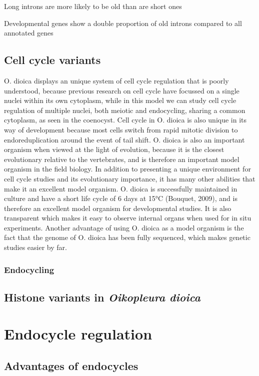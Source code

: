 \documentclass[11pt,twoside,a4paper]{report}
\begin{document}
Long introns are more likely to be old than are short ones

Developmental genes show a double proportion of old introns compared to all annotated genes
		

		\subsection{Cell cycle variants}
		\label{subsection:CellCycleVariants}
		O. dioica displays an unique system of cell cycle regulation that is poorly understood, because previous research on cell cycle have focussed on a single nuclei within its own cytoplasm, while in this model we can study cell cycle regulation of multiple nuclei, both meiotic and endocycling, sharing a common cytoplasm, as seen in the coenocyst. Cell cycle in O. dioica is also unique in its way of development because most cells switch from rapid mitotic division to endoreduplication around the event of tail shift. O. dioica is also an important organism when viewed at the light of evolution, because it is the closest evolutionary relative to the vertebrates, and is therefore an important model organism in the field biology. In addition to presenting a unique environment for cell cycle studies and its evolutionary importance, it has many other abilities that make it an excellent model organism. O. dioica is successfully maintained in culture and have a short life cycle of 6 days at 15°C (Bouquet, 2009), and is therefore an excellent model organism for developmental studies. It is also transparent which makes it easy to observe internal organs when used for in situ experiments. Another advantage of using O. dioica as a model organism is the fact that the genome of O. dioica has been fully sequenced, which makes genetic studies easier by far.
		
			\subsubsection{Endocycling}
		
		\subsection{Histone variants in \textit{Oikopleura dioica}}
		

	\section{Endocycle regulation}
		\subsection{Advantages of endocycles}
\end{document}
